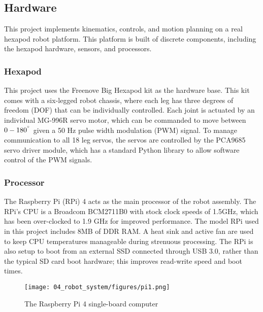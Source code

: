 \subsection{ Hardware }

 This project implements kinematics, controls, and motion planning on a real hexapod robot platform. This platform is built of discrete components, including the hexapod hardware, sensors, and processors.

\subsubsection{ Hexapod }

This project uses the Freenove Big Hexapod kit as the hardware base. This kit comes with a six-legged robot chassis, where each leg has three degrees of freedom (DOF) that can be individually controlled. Each joint is actuated by an individual MG-996R servo motor, which can be commanded to move between $0-180^{\degree}$ given a 50 Hz pulse width modulation (PWM) signal. To manage communication to all 18 leg servos, the servos are controlled by the PCA9685 servo driver module, which has a standard Python library to allow software control of the PWM signals.

\subsubsection{ Processor }
The Raspberry Pi (RPi) 4 acts as the main processor of the robot assembly.  The RPi's CPU is a Broadcom BCM2711B0 with stock clock speeds of 1.5GHz, which has been over-clocked to 1.9 GHz for improved performance.  The model RPi used in this project includes 8MB of DDR RAM. A heat sink and active fan are used to keep CPU temperatures manageable during strenuous processing. The RPi is also setup to boot from an external SSD connected through USB 3.0, rather than the typical SD card boot hardware; this improves read-write speed and boot times.

\begin{figure}[H]
    \centerline{\texttt{[image: 04\_robot\_system/figures/pi1.png]}}
    \caption{The Raspberry Pi 4 single-board computer}
    \label{fig:raspberry_pi}
\end{figure}

